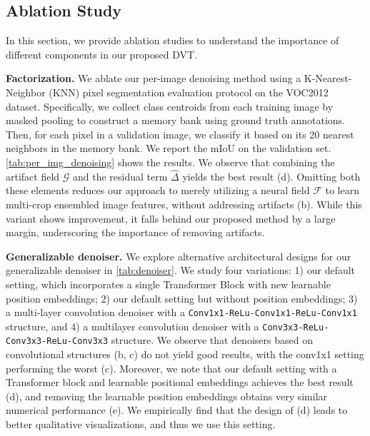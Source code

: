 \documentclass[runningheads]{llncs}
\newcommand{\ours}{DVT\xspace}
\renewcommand{\paragraph}[1]{\vspace{1.25mm}\noindent\textbf{#1}}
\begin{document}
\subsection{Ablation Study}
In this section, we provide ablation studies to understand the importance of different components in our proposed \ours.

\paragraph{Factorization.} We ablate our per-image denoising method using a K-Nearest-Neighbor (KNN) pixel segmentation evaluation protocol on the VOC2012 dataset. Specifically, we collect class centroids from each training image by masked pooling to construct a memory bank using ground truth annotations. Then, for each pixel in a validation image, we classify it based on its 20 nearest neighbors in the memory bank. We report the mIoU on the validation set. \cref{tab:per_img_denoising} shows the results. We observe that combining the artifact field $\mathcal{G}$ and the residual term $\hat{\Delta}$ yields the best result (d). Omitting both these elements reduces our approach to merely utilizing a neural field $\mathcal{F}$ to learn multi-crop ensembled image features, without addressing artifacts (b). While this variant shows improvement, it falls behind our proposed method by a large margin, underscoring the importance of removing artifacts.

\paragraph{Generalizable denoiser.} We explore alternative architectural designs for our generalizable denoiser in \cref{tab:denoiser}. We study four variations: 1) our default setting, which incorporates a single Transformer Block with new learnable position embeddings; 2) our default setting but without position embeddings; 3) a multi-layer convolution denoiser with a \texttt{Conv1x1-ReLu-Conv1x1-ReLu-Conv1x1} structure, and 4) a multilayer convolution denoiser with a \texttt{Conv3x3-ReLu-Conv3x3-ReLu-Conv3x3} structure. We observe that denoisers based on convolutional structures (b, c) do not yield good results, with the conv1x1 setting performing the worst (c).
Moreover, we note that our default setting with a Transformer block and learnable positional embeddings achieves the best result (d), and removing the learnable position embeddings obtains very similar numerical performance (e). We empirically find that the design of (d) leads to better qualitative visualizations, and thus we use this setting.
\end{document}
